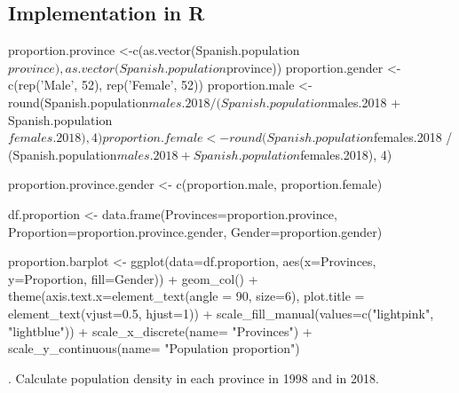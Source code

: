 \documentclass[12pt, oneside]{report}\usepackage[]{graphicx}\usepackage[]{color}
\begin{document}
\subsection*{Implementation in R}
\begin{Schunk}
\begin{Sinput}
proportion.province <-c(as.vector(Spanish.population$province), as.vector(Spanish.population$province))
proportion.gender <- c(rep('Male', 52), rep('Female', 52))
proportion.male <- round(Spanish.population$males.2018 / (Spanish.population$males.2018 + Spanish.population$females.2018), 4)
proportion.female <- round(Spanish.population$females.2018 / (Spanish.population$males.2018 + Spanish.population$females.2018), 4)

proportion.province.gender <- c(proportion.male, proportion.female)

df.proportion <- data.frame(Provinces=proportion.province, 
                            Proportion=proportion.province.gender, 
                            Gender=proportion.gender)

proportion.barplot <- ggplot(data=df.proportion, 
                             aes(x=Provinces, y=Proportion, fill=Gender)) + 
                      geom_col() + 
                      theme(axis.text.x=element_text(angle = 90, size=6), 
                            plot.title = element_text(vjust=0.5, hjust=1)) +
                      scale_fill_manual(values=c("lightpink", "lightblue")) +
                      scale_x_discrete(name= "Provinces") +
                      scale_y_continuous(name= "Population proportion")
\end{Sinput}
\end{Schunk}

. Calculate population density in each province in 1998 and in 2018.
\end{document}
